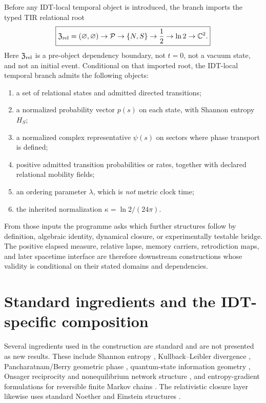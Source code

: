 \documentclass[11pt]{book}
\begin{document}
Before any IDT-local temporal object is introduced, the branch imports the typed TIR relational root
\[
\boxed{
\mathfrak Z_{\rm rel}=(\varnothing,\varnothing)
\to\mathcal P
\to\{N,S\}
\to\frac12
\to\ln2
\to\mathbb C^2.
}
\]
Here \(\mathfrak Z_{\rm rel}\) is a pre-object dependency boundary, not \(t=0\), not a vacuum state, and not an initial event. Conditional on that imported root, the IDT-local temporal branch admits the following objects:
\begin{enumerate}
\item a set of relational states and admitted directed transitions;
\item a normalized probability vector \(p(s)\) on each state, with Shannon entropy \(H_S\);
\item a normalized complex representative \(\psi(s)\) on sectors where phase transport is defined;
\item positive admitted transition probabilities or rates, together with declared relational mobility fields;
\item an ordering parameter \(\lambda\), which is \emph{not} metric clock time;
\item the inherited normalization \(\kappa=\ln 2/(24\pi)\).
\end{enumerate}

From those inputs the programme asks which further structures follow by definition, algebraic identity, dynamical closure, or experimentally testable bridge. The positive elapsed measure, relative lapse, memory carriers, retrodiction maps, and later spacetime interface are therefore downstream constructions whose validity is conditional on their stated domains and dependencies.

\section*{Standard ingredients and the IDT-specific composition}

Several ingredients used in the construction are standard and are not presented as new results. These include Shannon entropy \cite{Shannon1948}, Kullback--Leibler divergence \cite{KullbackLeibler1951}, Pancharatnam/Berry geometric phase \cite{Pancharatnam1956,Berry1984}, quantum-state information geometry \cite{ProvostVallee1980}, Onsager reciprocity and nonequilibrium network structure \cite{Onsager1931,Schnakenberg1976}, and entropy-gradient formulations for reversible finite Markov chains \cite{Maas2011}. The relativistic closure layer likewise uses standard Noether and Einstein structures \cite{Noether1971,Einstein1916}.
\end{document}
